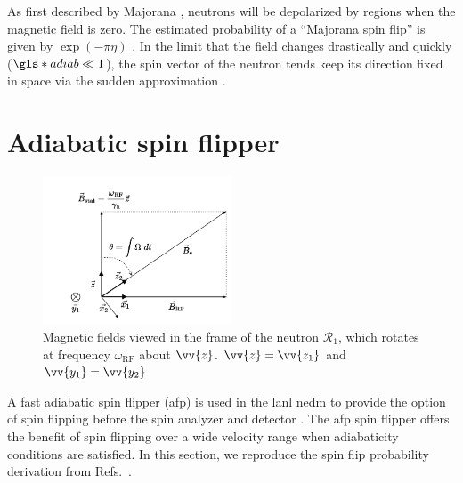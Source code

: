 As first described by Majorana \cite{Majorana1932}, neutrons will be depolarized by regions when the magnetic field is zero. The estimated probability of a ``Majorana spin flip'' is given by $\exp(-\pi\eta)$ \cite{golubUCN}. In the limit that the field changes drastically and quickly ($\gls*{adiab}\ll 1$), the spin vector of the neutron tends keep its direction fixed in space via the sudden approximation \cite{rabi_1936_space_quant, golubUCN}.




\section{Adiabatic spin flipper}\label{sec:afp}


\begin{figure}[htp]
    \centering
    \includegraphics[width=0.5\textwidth]{figures/adiabatic_spin_flip.pdf}
    \caption[{Magnetic fields viewed in the frame of the neutron $\mathcal{R}_1$, which rotates at frequency $\omega_\text{RF}$ about $\vec{z}$}]
            {Magnetic fields viewed in the frame of the neutron $\mathcal{R}_1$, which rotates at frequency $\omega_\text{RF}$ about $\vv{z}$. $\vv{z}=\vv{z_1}$ and $\vv{y_1}=\vv{y_2}$}
    \label{fig:adiabatic_spin_flip}
\end{figure}

A fast adiabatic spin flipper (\acrshort{afp}) is used in the \acrshort*{lanl} \acrshort*{nedm} to provide the option of spin flipping \ucn before the spin analyzer and detector \cite{holley_afp_2012}. The \acrshort*{afp} spin flipper offers the benefit of spin flipping \ucn over a wide velocity range when adiabaticity conditions are satisfied. In this section, we reproduce the spin flip probability derivation from Refs.~\cite{robiscoe_spin_flip, grigoriev_neutron_2001, rogel_thesis}.

